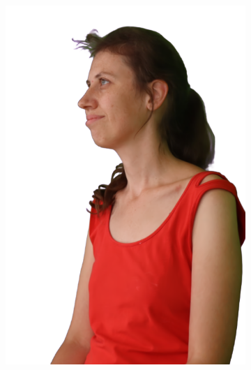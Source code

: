 \begin{figure}[!ht]
\begin{subfigure}{0.12\linewidth}
        \includegraphics[width=\textwidth]{Figures/results/initials/dora/26_render.png}

\end{subfigure}
\end{figure}
